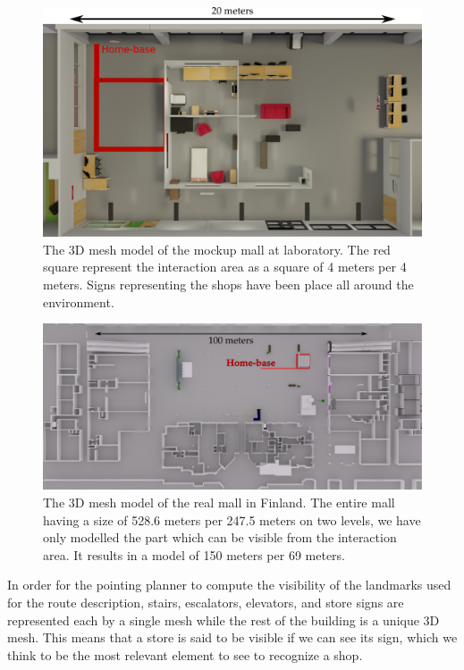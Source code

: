 \begin{figure}[ht!]
\centering
\includegraphics[scale=0.15]{figures/chapter8/adream_base_m.png}
\caption{\label{fig:chap8_adream_base} The 3D mesh model of the mockup mall at laboratory. The red square represent the interaction area as a square of 4 meters per 4 meters. Signs representing the shops have been place all around the environment. }
\end{figure}

\begin{figure}[ht!]
\centering
\includegraphics[scale=0.15]{figures/chapter8/ideapark_base_m.png}
\caption{\label{fig:chap8_ideapark_base} The 3D mesh model of the real mall in Finland. The entire mall having a size of 528.6 meters per 247.5 meters on two levels, we have only modelled the part which can be visible from the interaction area. It results in a model of 150 meters per 69 meters. }
\end{figure}

In order for the pointing planner to compute the visibility of the landmarks used for the route description, stairs, escalators, elevators, and store signs are represented each by a single mesh while the rest of the building is a unique 3D mesh. This means that a store is said to be visible if we can see its sign, which we think to be the most relevant element to see to recognize a shop.

